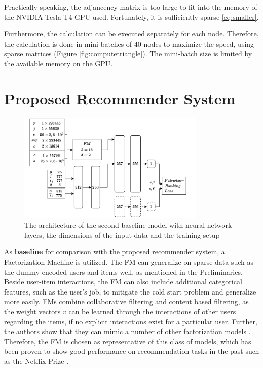  Practically speaking, the adjancency matrix is too large to fit into the memory of the NVIDIA Tesla T4 GPU used. Fortunately, it is sufficiently sparse \eqref{eq:smaller}.
 
 



 Furthermore, the calculation can be executed separately for each node. Therefore, the calculation is done in mini-batches of 40 nodes to maximize the speed, using sparse matrices \parencite{pytorch_sparse} (Figure \ref{fig:computetriangle}). The mini-batch size is limited by the available memory on the GPU.  


  






 

\section{Proposed Recommender System}


  \begin{figure}
    \centering
    \includegraphics[width=0.8\textwidth]{img/baseline.drawio (4).pdf}
    \caption[The architecture of the second baseline]{The architecture of the second baseline model with neural network layers, the dimensions of the input data and the training setup }
    \label{fig:baseline}
\end{figure}

As  \textbf{baseline} for comparison with the proposed recommender system,
a Factorization Machine
\parencite{rendle2010factorization} is utilized. The FM can generalize on sparse data such as the dummy encoded users and items well, as mentioned in the Preliminaries. Beside user-item interactions, the FM can also include additional categorical features, such as the user's job, to mitigate the cold start problem and generalize more easily. FMs combine collaborative filtering and content based filtering, as the weight vectors $v$ can be learned through the interactions of other users regarding the items, if no explicit interactions exist for a particular user. Further, the authors show that they can mimic a number of other factorization models \parencite{rendle2010factorization}. Therefore, the FM is chosen as representative of this class of models, which has been proven to show good performance on recommendation tasks in the past such as the Netflix Prize \parencite{freudenthaler2009factorization}.


